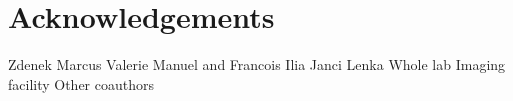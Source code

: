\chapter*{Acknowledgements}
Zdenek
Marcus
Valerie
Manuel and Francois
Ilia
Janci
Lenka
Whole lab
Imaging facility
Other coauthors
